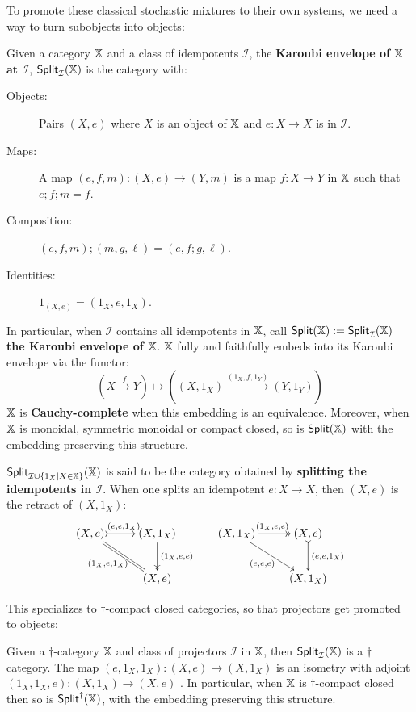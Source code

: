 To promote these classical stochastic mixtures to their own systems, we need a way to turn subobjects into objects:
\begin{definition}
\label{def:idem}
Given a category $\mathbb{X}$ and a class of idempotents $\mathcal I$, the {\bf Karoubi envelope of $\mathbb{X}$ at $\mathcal{I}$}, ${\sf Split}_{\mathcal I}(\mathbb{X})$ is the category with:
\begin{description}
\item[Objects:] Pairs $(X,e)$ where $X$ is an object of $\mathbb{X}$ and $e:X\to X$ is in $\mathcal I$.
\item[Maps:] A map $(e,f,m):(X,e)\to (Y,m)$ is a map $f:X\to Y$ in $\mathbb{X}$ such that $e;f;m=f$.
\item[Composition:] $(e,f,m);(m,g,\ell) = (e,f;g,\ell)$.
\item[Identities:] $1_{(X,e)}=(1_X,e,1_X)$.
\end{description}
In particular, when $\mathcal{I}$ contains all idempotents in $\mathbb{X}$, call  ${\sf Split}(\mathbb{X}):={\sf Split}_{\mathcal I}(\mathbb{X})$ {\bf the Karoubi envelope of $\mathbb{X}$}.
$\mathbb{X}$ fully and faithfully embeds into its Karoubi envelope via the functor:
$$
\left(X\xrightarrow{f}Y\right)
\mapsto 
\left((X,1_X)\xrightarrow{(1_X,f,1_Y)}(Y,1_Y)\right)
$$
$\mathbb{X}$ is {\bf Cauchy-complete} when this embedding is an equivalence. 
Moreover, when $\mathbb{X}$ is monoidal, symmetric monoidal or compact closed, so is ${\sf Split}(\mathbb{X})$ with the embedding preserving this structure.


${\sf Split}_{{\mathcal I }\cup \{ 1_X | X \in \mathbb{X}\}}(\mathbb{X})$ is said to be the category obtained by {\bf splitting the idempotents in $\mathcal I$}.
When one splits an idempotent $e:X\to X$, then $(X,e)$ is the retract of $(X, 1_X)$:
$$
\xymatrix{
(X,e) \ar@{>->}[r]^{(e,e,1_X)} \ar@{=}[dr]_{(1_X,e,1_X)} & (X,1_X)  \ar@{->>}[d]^{(1_X,e,e)}\\
& (X,e)
}\, \hspace*{.5cm}
\xymatrix{
(X,1_X) \ar@{->>}[r]^{(1_X,e,e)} \ar[dr]_{(e,e,e)} & (X,e)  \ar@{>->}[d]^{(e,e,1_X)}\\
& (X,1_X)
}
$$
\end{definition}
This specializes to $\dag$-compact closed categories, so that projectors get promoted to objects:
\begin{definition}
\label{def:dagidem}
Given a $\dag$-category $\mathbb{X}$ and class of projectors $\mathcal I$ in $\mathbb{X}$, then  ${\sf Split}_{\mathcal I}(\mathbb{X})$ is a $\dag$ category.
The map $(e,1_X, 1_X) :(X,e)\to (X,1_X)$ is an isometry with adjoint $(1_X,1_X, e) :(X,1_X)\to (X,e)$ .
In particular, when $\mathbb{X}$ is $\dag$-compact closed then so is ${\sf Split}^\dag(\mathbb{X})$, with the embedding preserving this structure.
\end{definition}
